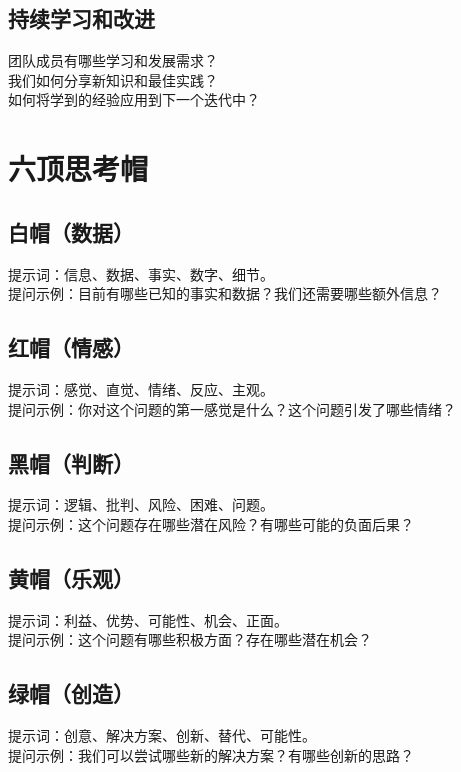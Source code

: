 \documentclass[12pt]{book}
\begin{document}
\subsection{持续学习和改进}
团队成员有哪些学习和发展需求？\\
我们如何分享新知识和最佳实践？\\
如何将学到的经验应用到下一个迭代中？\\


\section{六顶思考帽}
\subsection{白帽（数据）}
提示词：信息、数据、事实、数字、细节。\\
提问示例：目前有哪些已知的事实和数据？我们还需要哪些额外信息？\\
\subsection{红帽（情感）}
提示词：感觉、直觉、情绪、反应、主观。\\
提问示例：你对这个问题的第一感觉是什么？这个问题引发了哪些情绪？\\

\subsection{黑帽（判断）}
提示词：逻辑、批判、风险、困难、问题。\\
提问示例：这个问题存在哪些潜在风险？有哪些可能的负面后果？\\

\subsection{黄帽（乐观）}
提示词：利益、优势、可能性、机会、正面。\\
提问示例：这个问题有哪些积极方面？存在哪些潜在机会？\\

\subsection{绿帽（创造）}
提示词：创意、解决方案、创新、替代、可能性。\\
提问示例：我们可以尝试哪些新的解决方案？有哪些创新的思路？\\
\end{document}
